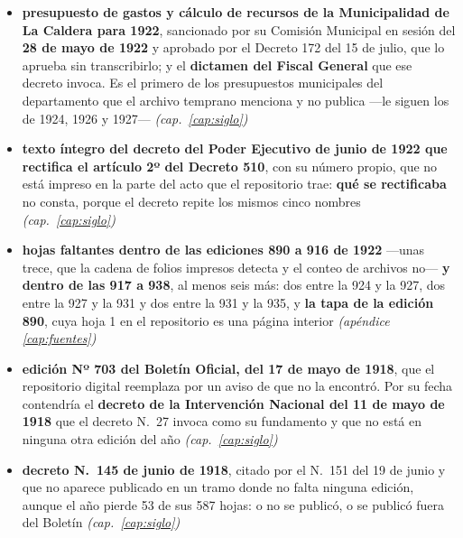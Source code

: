 \begin{itemize}[leftmargin=*]
\item \textbf{presupuesto de gastos y cálculo de recursos de la Municipalidad de La Caldera para 1922}, sancionado por su Comisión Municipal en sesión del \textbf{28 de mayo de 1922} y aprobado por el Decreto 172 del 15 de julio, que lo aprueba sin transcribirlo; y el \textbf{dictamen del Fiscal General} que ese decreto invoca. Es el primero de los presupuestos municipales del departamento que el archivo temprano menciona y no publica ---le siguen los de 1924, 1926 y 1927--- \textit{(cap.\ \ref{cap:siglo})}
\item \textbf{texto íntegro del decreto del Poder Ejecutivo de junio de 1922 que rectifica el artículo 2º del Decreto 510}, con su número propio, que no está impreso en la parte del acto que el repositorio trae: \textbf{qué se rectificaba} no consta, porque el decreto repite los mismos cinco nombres \textit{(cap.\ \ref{cap:siglo})}
\item \textbf{hojas faltantes dentro de las ediciones 890 a 916 de 1922} ---unas trece, que la cadena de folios impresos detecta y el conteo de archivos no--- \textbf{y dentro de las 917 a 938}, al menos seis más: dos entre la 924 y la 927, dos entre la 927 y la 931 y dos entre la 931 y la 935, y \textbf{la tapa de la edición 890}, cuya hoja 1 en el repositorio es una página interior \textit{(apéndice \ref{cap:fuentes})}
\item \textbf{edición Nº 703 del Boletín Oficial, del 17 de mayo de 1918}, que el repositorio digital reemplaza por un aviso de que no la encontró. Por su fecha contendría el \textbf{decreto de la Intervención Nacional del 11 de mayo de 1918} que el decreto N.\ 27 invoca como su fundamento y que no está en ninguna otra edición del año \textit{(cap.\ \ref{cap:siglo})}
\item \textbf{decreto N.\ 145 de junio de 1918}, citado por el N.\ 151 del 19 de junio y que no aparece publicado en un tramo donde no falta ninguna edición, aunque el año pierde 53 de sus 587 hojas: o no se publicó, o se publicó fuera del Boletín \textit{(cap.\ \ref{cap:siglo})}


\end{itemize}
